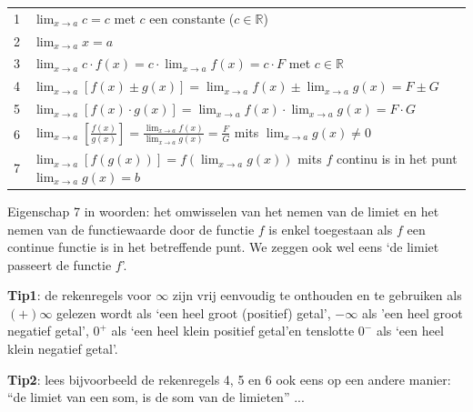\begin{ftrekenregel}
	\begin{tabel*}{}
	\centering
	\begin{tabular}{ll}

		1 & $\lim_{x\to a}c=c$ met $c$ een constante ($c\in\mathbb{R}$)\\

		2 & $\lim_{x\to a}x=a$  \\

		3 & $\lim_{x\to a}c\cdot f(x)=c\cdot \lim_{x\to a}f(x)=c\cdot F$  met $c\in\mathbb{R}$\\

		4 & $\lim_{x\to a}\left[f(x)\pm g(x)\right]=\lim_{x\to a}f(x)\pm\lim_{x\to a}g(x)=F\pm G$  \\

		5 & $\lim_{x\to a}\left[f(x)\cdot g(x)\right]=\lim_{x\to a}f(x)\cdot \lim_{x\to a}g(x)=F\cdot G$  \\

		6 & $\lim_{x\to a}\left[\frac{f(x)}{g(x)}\right]=\frac{\lim_{x\to a}f(x)}{\lim_{x\to a}g(x)}=\frac{F}{G}$  mits $\lim_{x\to a}g(x)\neq0$\\

		7 & $\lim_{x\to a}\left[f\left(g(x)\right)\right]=f\left(\lim_{x\to a}g(x)\right)$  mits $f$ continu is in het punt $\lim_{x\to a}g(x)=b$ \\


	\end{tabular}
\end{tabel*}
\end{ftrekenregel}

Eigenschap 7 in woorden: het omwisselen van het nemen van
de limiet en het nemen van de functiewaarde door de functie $f$ is
enkel toegestaan als $f$ een continue functie is in het betreffende
punt. We zeggen ook wel eens \textquoteleft de limiet passeert de functie $f$\textquoteright.

\textbf{Tip1}: de rekenregels voor $\infty$ zijn vrij eenvoudig
te onthouden en te gebruiken als $(+)\infty$ gelezen wordt als \textquoteleft een
heel groot (positief) getal\textquoteright, $-\infty$ als 'een heel groot negatief
getal', $0^{+}$ als \textquoteleft een heel klein positief getal\textquoteright en tenslotte $0^{-}$
als \textquoteleft een heel klein negatief getal\textquoteright.

\textbf{Tip2}: lees bijvoorbeeld de rekenregels 4, 5 en 6 ook eens
op een andere manier: ``de limiet van een som, is de som van de limieten''
...

